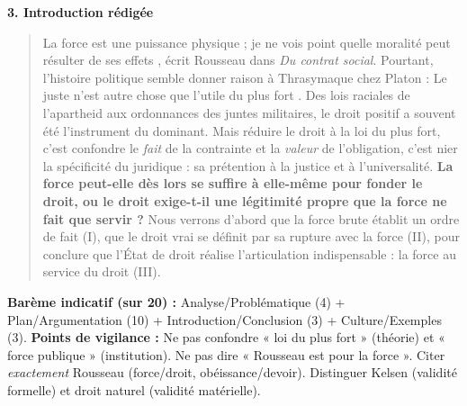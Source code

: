 \documentclass[11pt]{article}
\begin{document}
\begin{corrige}
\textbf{3. Introduction rédigée}
\begin{quote}
\guillemotleft La force est une puissance physique ; je ne vois point quelle moralité peut résulter de ses effets \guillemotright, écrit Rousseau dans \emph{Du contrat social}. Pourtant, l'histoire politique semble donner raison à Thrasymaque chez Platon : \guillemotleft Le juste n'est autre chose que l'utile du plus fort \guillemotright. Des lois raciales de l'apartheid aux ordonnances des juntes militaires, le droit positif a souvent été l'instrument du dominant. Mais réduire le droit à la loi du plus fort, c'est confondre le \emph{fait} de la contrainte et la \emph{valeur} de l'obligation, c'est nier la spécificité du juridique : sa prétention à la justice et à l'universalité. \textbf{La force peut-elle dès lors se suffire à elle-même pour fonder le droit, ou le droit exige-t-il une légitimité propre que la force ne fait que servir ?} Nous verrons d'abord que la force brute établit un ordre de fait (I), que le droit vrai se définit par sa rupture avec la force (II), pour conclure que l'État de droit réalise l'articulation indispensable : la force au service du droit (III).
\end{quote}

\textbf{Barème indicatif (sur 20) :} Analyse/Problématique (4) + Plan/Argumentation (10) + Introduction/Conclusion (3) + Culture/Exemples (3).
\textbf{Points de vigilance :} Ne pas confondre « loi du plus fort » (théorie) et « force publique » (institution). Ne pas dire « Rousseau est pour la force ». Citer \emph{exactement} Rousseau (force/droit, obéissance/devoir). Distinguer Kelsen (validité formelle) et droit naturel (validité matérielle).
\end{corrige}
\end{document}
